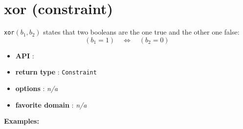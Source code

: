 \label{xor}
\hypertarget{xor}{}

\section{xor (constraint)}\label{xor:xorconstraint}\hypertarget{xor:xorconstraint}{}
\begin{notedef}
    \texttt{xor}$(b_1,b_2)$ states that two booleans are the one true and the other one false:
$$ (b_1=1)\quad \iff\quad (b_2=0)$$
\end{notedef}

\begin{itemize}
    \item \textbf{API} : 
	\item \textbf{return type} : \texttt{Constraint}
	\item \textbf{options} : \emph{n/a}
	\item \textbf{favorite domain} : \emph{n/a}
\end{itemize}

\textbf{Examples:}

